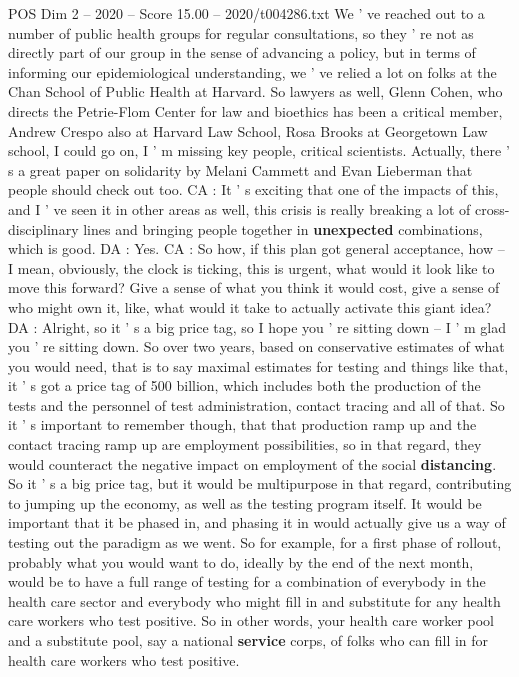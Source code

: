 \begin{textsample}{POS Dim 2 – 2020 – Score 15.00 – 2020/t004286.txt}
We ' ve reached out to a number of public health groups for regular consultations, so they ' re not as directly part of our group in the sense of advancing a policy, but in terms of informing our epidemiological understanding, we ' ve relied a lot on folks at the Chan School of Public Health at Harvard.
So lawyers as well, Glenn Cohen, who directs the Petrie-Flom Center for law and bioethics has been a critical member, Andrew Crespo also at Harvard Law School, Rosa Brooks at Georgetown Law school, I could go on, I ' m missing key people, critical scientists.
Actually, there ' s a great paper on solidarity by Melani Cammett and Evan Lieberman that people should check out too.
CA : It ' s exciting that one of the impacts of this, and I ' ve seen it in other areas as well, this crisis is really breaking a lot of cross-disciplinary lines and bringing people together in \textbf{unexpected} combinations, which is good.
DA : Yes.
CA : So how, if this plan got general acceptance, how -- I mean, obviously, the clock is ticking, this is urgent, what would it look like to move this forward?
Give a sense of what you think it would cost, give a sense of who might own it, like, what would it take to actually activate this giant idea?
DA : Alright, so it ' s a big price tag, so I hope you ' re sitting down -- I ' m glad you ' re sitting down.
So over two years, based on conservative estimates of what you would need, that is to say maximal estimates for testing and things like that, it ' s got a price tag of 500 billion, which includes both the production of the tests and the personnel of test administration, contact tracing and all of that.
So it ' s important to remember though, that that production ramp up and the contact tracing ramp up are employment possibilities, so in that regard, they would counteract the negative impact on employment of the social \textbf{distancing}.
So it ' s a big price tag, but it would be multipurpose in that regard, contributing to jumping up the economy, as well as the testing program itself.
It would be important that it be phased in, and phasing it in would actually give us a way of testing out the paradigm as we went.
So for example, for a first phase of rollout, probably what you would want to do, ideally by the end of the next month, would be to have a full range of testing for a combination of everybody in the health care sector and everybody who might fill in and substitute for any health care workers who test positive.
So in other words, your health care worker pool and a substitute pool, say a national \textbf{service} corps, of folks who can fill in for health care workers who test positive.

\end{textsample}
